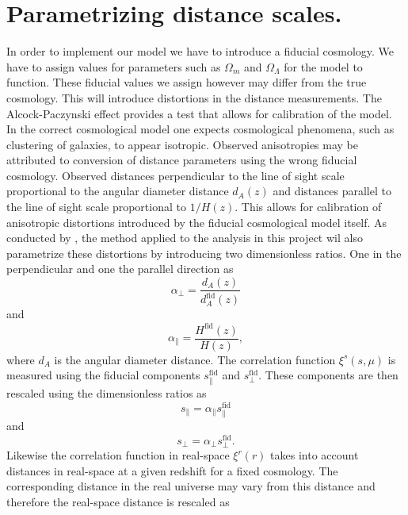 \section{Parametrizing distance scales.}\label{sec:rescale_r}
In order to implement our model we have to introduce a fiducial cosmology. We have to assign values for parameters such as $\Omega_m$ and $\Omega_\Lambda$ for the model to function. These fiducial values we assign however may differ from the true cosmology. This will introduce distortions in the distance measurements. The Alcock-Paczynski effect\cite{Alcockpaczynski} provides a test that allows for calibration of the model. In the correct cosmological model one expects cosmological phenomena, such as clustering of galaxies, to appear isotropic. Observed anisotropies may be attributed to conversion of distance parameters using the wrong fiducial cosmology. Observed distances perpendicular to the line of sight scale proportional to the angular diameter distance $d_A(z)$ and distances parallel to the line of sight scale proportional to $1/H(z)$. This allows for calibration of anisotropic distortions introduced by the fiducial cosmological model itself. As conducted by \cite{BeyondBAO}, the method applied to the analysis in this project wil also parametrize these distortions by introducing two dimensionless ratios. One in the perpendicular and one the parallel direction as
\begin{equation}\label{eq:alpha_perp}
    \alpha_\perp=\frac{d_A(z)}{d_A^{\mathrm{fid}}(z)}
\end{equation} 
and
\begin{equation}\label{eq:alpha_par}
    \alpha_\parallel=\frac{H^{\mathrm{fid}}(z)}{H(z)},
\end{equation}
where $d_A$ is the angular diameter distance. The correlation function $\xi^s(s,\mu)$ is measured using the fiducial
components $s_\parallel^\mathrm{fid}$ and $s_\perp^\mathrm{fid}$. These components are then rescaled using the dimensionless ratios as
\begin{equation}
    s_\parallel=\alpha_\parallel s_\parallel^\mathrm{fid}
\end{equation}
and 
\begin{equation}
    s_\perp = \alpha_\perp s_\perp^\mathrm{fid}.
\end{equation}
Likewise the correlation function in real-space $\xi^r(r)$ takes into account distances in real-space at a given redshift for a fixed cosmology. The corresponding distance in the real universe may vary from this distance and therefore the real-space distance is rescaled as
